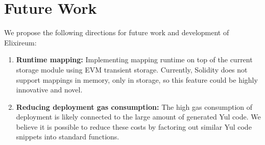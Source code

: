 \section{Future Work}

We propose the following directions for future work and development of Elixireum:

\begin{enumerate}
\item \textbf{Runtime mapping:} Implementing mapping runtime on top of the current storage module using EVM transient storage. Currently, Solidity does not support mappings in memory, only in storage, so this feature could be highly innovative and novel.
\item \textbf{Reducing deployment gas consumption:} The high gas consumption of deployment is likely connected to the large amount of generated Yul code. We believe it is possible to reduce these costs by factoring out similar Yul code snippets into standard functions.
\end{enumerate}

